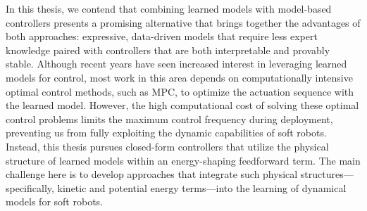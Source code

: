 
In this thesis, we contend that combining learned models with model-based controllers presents a promising alternative that brings together the advantages of both approaches: expressive, data-driven models that require less expert knowledge paired with controllers that are both interpretable and provably stable. Although recent years have seen increased interest in leveraging learned models for control, most work in this area depends on computationally intensive optimal control methods, such as \gls{MPC}, to optimize the actuation sequence with the learned model. However, the high computational cost of solving these optimal control problems limits the maximum control frequency during deployment, preventing us from fully exploiting the dynamic capabilities of soft robots. Instead, this thesis pursues closed-form controllers that utilize the physical structure of learned models within an energy-shaping feedforward term. The main challenge here is to develop approaches that integrate such physical structures—specifically, kinetic and potential energy terms—into the learning of dynamical models for soft robots.
